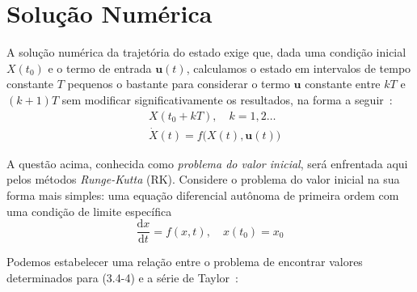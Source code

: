 \section{Solução Numérica}

A solução numérica da trajetória do estado exige que, dada uma condição inicial \(X\left(t_{0}\right)\) e o termo de entrada \(\mathbf{u}(t)\), calculamos o estado em intervalos de tempo constante \(T\) pequenos o bastante para considerar o termo \(\mathbf{u}\) constante entre \(kT\) e \(\left(k+1\right)T\) sem modificar significativamente os resultados, na forma a seguir~\cite{Stevens2016}:
\begin{align*}
    &X \left( t_{0} + kT \right), \quad k = 1,2 \ldots\tag{3.4-1a} \\
    &\dot{X} \left( t \right) = f \big(X\left(t\right), \mathbf{u}\left(t\right)\big)\tag{3.4-1b}
\end{align*}


A questão acima, conhecida como \emph{problema do valor inicial}, será enfrentada aqui pelos métodos \emph{Runge-Kutta} (RK). Considere o problema do valor inicial na sua forma mais simples: uma equação diferencial autônoma de primeira ordem com uma condição de limite específica~\cite{Stevens2016}
\begin{equation*}\tag{3.4-2}
    {\frac{\textrm{d}x}{\textrm{d}t}} = f \left( x, t \right), \quad
    x \left( t_{0} \right) = x_{0}
\end{equation*}

Podemos estabelecer uma relação entre o problema de encontrar valores determinados para (3.4-4) e a série de Taylor~\cite{Stevens2016}:

